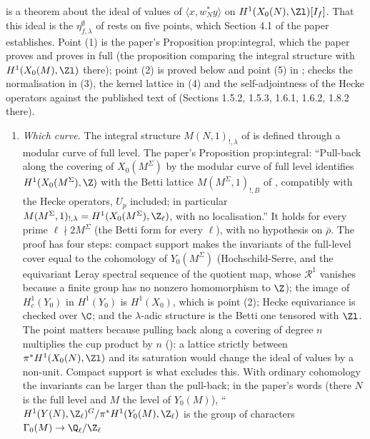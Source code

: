 \begin{remark}\label{rem:moddeg:dfg-normalisation}
 is a theorem about the ideal of values of $\langle x,w_N^*y\rangle$ on $H^1(X_0(N),\Zl)[I_f]$. That this ideal is the $\eta^\emptyset_{f,\lambda}$ of \cite{DFG04} rests on five
points, which Section 4.1 of the paper establishes. Point (1) is the paper's Proposition prop:integral, which the paper proves and  proves in full
(the proposition comparing the integral structure with $H^1(X_0(M),\Zl)$ there); point (2) is proved below and point (5) in ;  checks the normalisation in (3), the kernel lattice in (4) and the
self-adjointness of the Hecke operators against the published text of \cite{DFG04} (Sections 1.5.2, 1.5.3, 1.6.1, 1.6.2, 1.8.2 there).
\begin{enumerate}[label=(\arabic*)]
\item \emph{Which curve.} The integral structure $M(N,1)_{!,\lambda}$ of \cite{DFG04} is defined through a modular curve of full level. The paper's Proposition prop:integral: ``Pull-back along the
covering of $X_0(M^\Sigma)$ by the modular curve of full level identifies $H^1(X_0(M^\Sigma),\Z)$ with the Betti lattice $M(M^\Sigma,1)_{!,B}$ of \cite[\S1.4.2]{DFG04}, compatibly with the Hecke
operators, $U_p$ included; in particular $M(M^\Sigma,1)_{!,\lambda}=H^1(X_0(M^\Sigma),\Z_\ell)$, with no localisation.'' It holds for every prime $\ell\nmid2M^\Sigma$ (the Betti form for every $\ell$), with no hypothesis on $\bar\rho$. The
proof has four steps: compact support makes the invariants of the full-level cover equal to the cohomology of $Y_0(M^\Sigma)$ (Hochschild-Serre, and the equivariant Leray spectral sequence of
the quotient map, whose $\mathcal R^1$ vanishes because a finite group has no nonzero homomorphism to $\Z$); the image of $H^1_c(Y_0)$ in $H^1(Y_0)$ is $H^1(X_0)$, which is point (2); Hecke
equivariance is checked over $\C$; and the $\lambda$-adic structure is the Betti one tensored with $\Zl$. The point matters because pulling back along a covering of degree $n$ multiplies the
cup product by $n$ (): a lattice strictly between $\pi^*H^1(X_0(N),\Zl)$ and its saturation would change the ideal of values by a non-unit. Compact support is what excludes this.
With ordinary cohomology the invariants can be larger than the pull-back; in the paper's words (there $N$ is the full level and $M$ the level of $Y_0(M)$), ``$H^1(Y(N),\Z_\ell)^G/\pi^*H^1(Y_0(M),\Z_\ell)$ is the group of characters $\Gamma_0(M)\to\Q_\ell/\Z_\ell$

\end{enumerate}
\end{remark}
